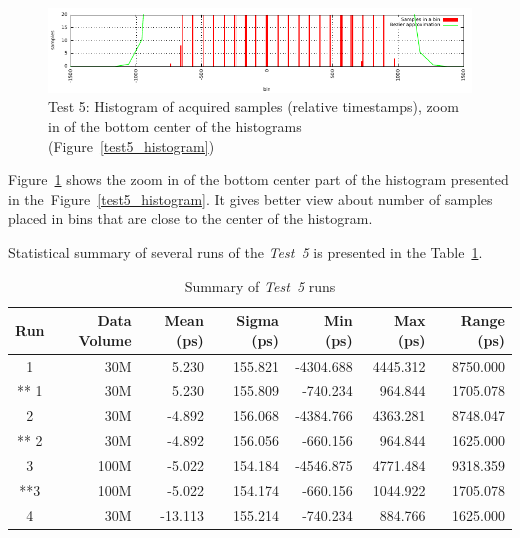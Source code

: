 \documentclass[a4paper, 12pt]{article}
\begin{document}
\begin{figure}[ht!]
  \centering
  \includegraphics[width=1\textwidth]{img/test5_histogram_zoomx.pdf}
  \caption{Test 5: Histogram of acquired samples (relative timestamps),
           zoom in of the bottom center of the histograms
           (Figure~\ref{test5_histogram})}
  \label{test5_histogram_zoomx}
\end{figure}

Figure~\ref{test5_histogram_zoomx} shows the zoom in of the bottom center
part of the histogram presented in the~Figure~\ref{test5_histogram}.
It gives better view about number of samples placed in bins that are close to
the center of the histogram.
\FloatBarrier

Statistical summary of several runs of the \textit{Test~5} is presented in
the Table~\ref{table_test5_summary}.

\begin{table}[!htb]
  \centering
  \footnotesize
  \begin{tabular}{|c|r|r|r|r|r|r|}
    \hline {\bf Run} & {\bf Data Volume} & {\bf Mean (ps)} & {\bf Sigma (ps)} & {\bf Min (ps)} & {\bf Max (ps)} & {\bf Range (ps)}  \\
    \hline
    1                &               30M &           5.230 &          155.821 &      -4304.688 &       4445.312 &          8750.000 \\
    ** 1             &               30M &           5.230 &          155.809 &       -740.234 &        964.844 &          1705.078 \\
    2                &               30M &          -4.892 &          156.068 &      -4384.766 &       4363.281 &          8748.047 \\
    ** 2             &               30M &          -4.892 &          156.056 &       -660.156 &        964.844 &          1625.000 \\
    3                &              100M &          -5.022 &          154.184 &      -4546.875 &       4771.484 &          9318.359 \\
    **3              &              100M &          -5.022 &          154.174 &       -660.156 &       1044.922 &          1705.078 \\
    4                &               30M &         -13.113 &          155.214 &       -740.234 &        884.766 &          1625.000 \\
    \hline
  \end{tabular}
  \caption{Summary of \textit{Test~5} runs}
  \label{table_test5_summary}
\end{table}
\end{document}
